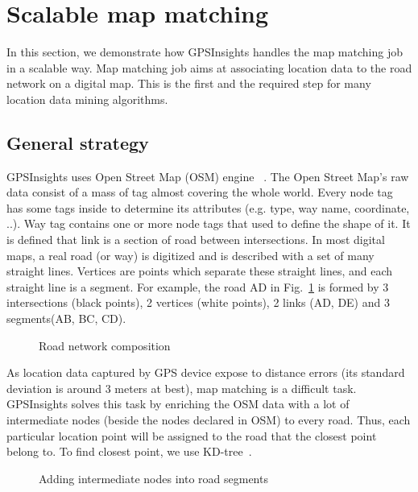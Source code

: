 \documentclass{acm_proc_article-sp}
\begin{document}
\section{Scalable map matching}

In this section, we demonstrate how GPSInsights handles the map matching job in a scalable way. Map matching job aims at associating location data to the road network on a digital map. This is the first and the required step for many location data mining algorithms. 
	
\subsection{General strategy} \label{ssec:links}

GPSInsights uses Open Street Map (OSM) engine ~\cite{openstreetmap}. The Open Street Map's raw data consist of a mass of tag almost covering the whole world. Every node tag has some tags inside to determine its attributes (e.g. type, way name, coordinate, ..). Way tag contains one or more node tags that used to define the shape of it. It is defined that link is a section of road between intersections. In most digital maps, a real road (or way) is digitized and is described with a set of many straight lines. Vertices are points which separate these straight lines, and each straight line is a segment. For example, the road AD in Fig.~\ref{fig:composition} is formed by 3 intersections (black points), 2 vertices (white points), 2 links (AD, DE) and 3 segments(AB, BC, CD).
		
\begin{figure}[h]
\centering
{}
\caption{Road network composition}
\label{fig:composition}
\end{figure}
	
As location data captured by GPS device expose to distance errors (its standard deviation is around 3 meters at best), map matching is a difficult task. GPSInsights solves this task by enriching the OSM data with a lot of intermediate nodes (beside the nodes declared in OSM) to every road. Thus, each particular location point will be assigned to the road that the closest point belong to. To find closest point, we use KD-tree~\cite{moh2013approximate}. 

	
\begin{figure}[h]
\centering
{}
\caption{Adding intermediate nodes into road segments}
\label{fig:addPointsToRoad}
\end{figure}
	
\end{document}
